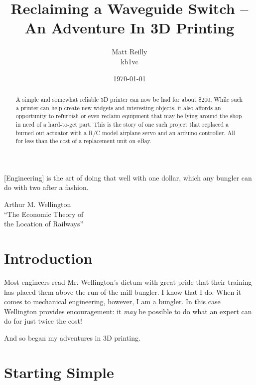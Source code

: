 \documentclass[12pt]{article}
\title{Reclaiming a Waveguide Switch -- An Adventure In 3D Printing}
\author{Matt Reilly  \\
	kb1vc \\
	}
\date{\today}
\begin{document}
\maketitle

\begin{abstract}
  A simple and somewhat reliable 3D printer can now be had for about \$200.
  While such a printer can help create new widgets and interesting objects, 
  it also affords an opportunity to refurbish or even reclaim equipment that
  may be lying around the shop in need of a hard-to-get part. This is the
  story of one such project that replaced a burned out actuator with a
  R/C model airplane servo and an arduino controller.  All for 
  less than the cost of a replacement unit on eBay.
\end{abstract}

\epigraph{[Engineering] is the art of doing that well with one dollar,
  which any bungler can do with two after a fashion.}{Arthur M. Wellington \\
  ``The Economic Theory of \\
  the Location of Railways''}





\section{Introduction}

Most engineers read Mr. Wellington's dictum with great pride
that their training has placed them above the run-of-the-mill bungler.
I know that I do.
When it comes to mechanical engineering, however, I am a bungler.
In this case Wellington provides encouragement: it {\em may} be possible
to do what an expert can do for just twice the cost!

And so began my adventures in 3D printing.


\section{Starting Simple}
\end{document}
